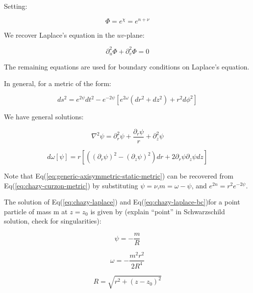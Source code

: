 \documentclass{article}
\begin{document}
Setting:

\begin{equation}
\Phi=e^{\chi}=e^{n+\nu}
\end{equation}


We recover Laplace's equation in the $uv$-plane:

\begin{equation}
\partial_{u}^{2}\Phi+\partial_{v}^{2}\Phi=0
\end{equation}


The remaining equations are used for boundary conditions on Laplace's
equation.

In general, for a metric of the form:

\begin{equation}
ds^{2}=e^{2\psi}dt^{2}-e^{-2\psi}\left[e^{2\omega}\left(dr^{2}+dz^{2}\right)+r^{2}d\phi^{2}\right]\label{eq:chazy-curzon-metric}
\end{equation}


We have general solutions:

\begin{equation}
\nabla^{2}\psi=\partial_{r}^{2}\psi+\frac{\partial_{r}\psi}{r}+\partial_{z}^{2}\psi\label{eq:chazy-laplace}
\end{equation}


\begin{equation}
d\omega\left[\psi\right]=r\left[\left(\left(\partial_{r}\psi\right)^{2}-\left(\partial_{z}\psi\right)^{2}\right)dr+2\partial_{r}\psi\partial_{z}\psi dz\right]\label{eq:chazy-laplace-bc}
\end{equation}


Note that Eq(\ref{eq:generic-axisymmetric-static-metric}) can be
recovered from Eq(\ref{eq:chazy-curzon-metric}) by substituting $\psi=\nu$,$m=\omega-\psi$,
and $e^{2n}=r^{2}e^{-2\psi}$.

The solution of Eq(\ref{eq:chazy-laplace}) and Eq(\ref{eq:chazy-laplace-bc})for
a point particle of mass m at $z=z_{0}$ is given by (explain ``point''
in Schwarzschild solution, check for singularities):

\begin{equation}
\psi=-\frac{m}{R}
\end{equation}


\begin{equation}
\omega=-\frac{m^{2}r^{2}}{2R^{4}}
\end{equation}


\begin{equation}
R=\sqrt{r^{2}+\left(z-z_{0}\right)^{2}}
\end{equation}
\end{document}
